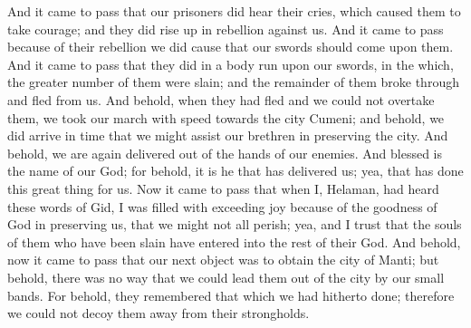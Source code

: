 And it came to pass that our prisoners did hear their cries, which caused them to take courage; and they did rise up in rebellion against us.
\bverse \iffalse And it came to pass because of their rebellion we did cause that our swords should come upon them. And it came to pass that they did in a body run upon our swords, in the which, the greater number of them were slain; and the remainder of them broke through and fled from us. \fi
And it came to pass because of their rebellion we did cause that our swords should come upon them. And it came to pass that they did in a body run upon our swords, in the which, the greater number of them were slain; and the remainder of them broke through and fled from us.
\bverse \iffalse And behold, when they had fled and we could not overtake them, we took our march with speed towards the city Cumeni; and behold, we did arrive in time that we might assist our brethren in preserving the city. \fi
And behold, when they had fled and we could not overtake them, we took our march with speed towards the city Cumeni; and behold, we did arrive in time that we might assist our brethren in preserving the city.
\bverse \iffalse And behold, we are again delivered out of the hands of our enemies. And blessed is the name of our God; for behold, it is he that has delivered us; yea, that has done this great thing for us. \fi
And behold, we are again delivered out of the hands of our enemies. And blessed is the name of our God; for behold, it is he that has delivered us; yea, that has done this great thing for us.
\bverse \iffalse Now it came to pass that when I, Helaman, had heard these words of Gid, I was filled with exceeding joy because of the goodness of God in preserving us, that we might not all perish; yea, and I trust that the souls of them who have been slain have entered into the rest of their God. \fi
Now it came to pass that when I, Helaman, had heard these words of Gid, I was filled with exceeding joy because of the goodness of God in preserving us, that we might not all perish; yea, and I trust that the souls of them who have been slain have entered into the rest of their God.
\bchapter
\bverse \iffalse And behold, now it came to pass that our next object was to obtain the city of Manti; but behold, there was no way that we could lead them out of the city by our small bands. For behold, they remembered that which we had hitherto done; therefore we could not decoy them away from their strongholds. \fi
And behold, now it came to pass that our next object was to obtain the city of Manti; but behold, there was no way that we could lead them out of the city by our small bands. For behold, they remembered that which we had hitherto done; therefore we could not decoy them away from their strongholds.
